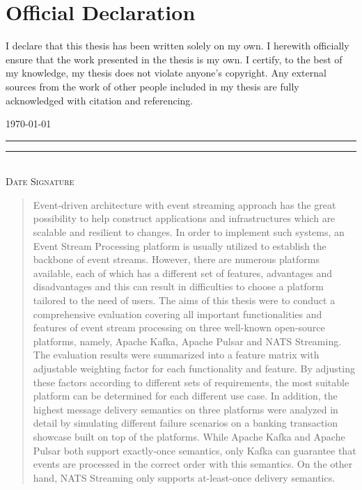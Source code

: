 \pagestyle{scrplain} %
\section*{Official Declaration}
\noindent
I declare that this thesis has been written solely on my own. I herewith officially ensure that the work presented in the thesis is my own. I certify, to the best of my knowledge, my thesis does not violate anyone's copyright. Any external sources from the work of other people included in my thesis are fully acknowledged with citation and referencing.


\vspace{2cm}
\hspace*{0.9cm} \today \\
\rule{4cm}{0.1pt} \hfill \rule{7cm}{0.1pt} \\
\hspace*{1.5cm} \textsc{Date} \hspace*{7cm} \textsc{Signature}

\cleardoublepage




\pagestyle{scrheadings} %

\begin{abstract}	
Event-driven architecture with event streaming approach has the great possibility to help construct applications and infrastructures which are scalable and resilient to changes. In order to implement such systems, an Event Stream Processing platform is usually utilized to establish the backbone of event streams. However, there are numerous platforms available, each of which has a different set of features, advantages and disadvantages and this can result in difficulties to choose a platform tailored to the need of users. The aims of this thesis were to conduct a comprehensive evaluation covering all important functionalities and features of event stream processing on three well-known open-source platforms, namely, Apache Kafka, Apache Pulsar and NATS Streaming. The evaluation results were summarized into a feature matrix with adjustable weighting factor for each functionality and feature. By adjusting these factors according to different sets of requirements, the most suitable platform can be determined for each different use case. In addition, the highest message delivery semantics on three platforms were analyzed in detail by simulating different failure scenarios on a banking transaction showcase built on top of the platforms. While Apache Kafka and Apache Pulsar both support exactly-once semantics, only Kafka can guarantee that events are processed in the correct order with this semantics. On the other hand, NATS Streaming only supports at-least-once delivery semantics.   
\end{abstract}


\cleardoublepage
\tableofcontents

\cleardoublepage
